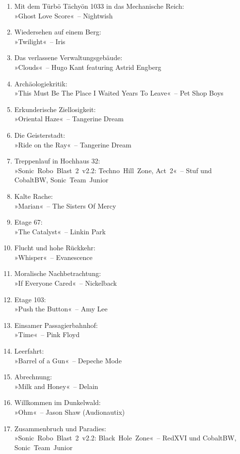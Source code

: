 \begin{enumerate}
    \item Mit dem Türbö Tächyön 1033 in das Mechanische Reich:\\ »Ghost Love Score«~– Nightwish
    \item Wiedersehen auf einem Berg:\\ »Twilight«~– Iris
    \item Das verlassene Verwaltungsgebäude:\\ »Clouds«~– Hugo Kant featuring Astrid Engberg
    \item Archäologiekritik:\\ »This Must Be The Place I Waited Years To Leave«~– Pet Shop Boys
    \item Erkunderische Ziellosigkeit:\\ »Oriental Haze«~– Tangerine Dream
    \item Die Geisterstadt:\\ »Ride on the Ray«~– Tangerine Dream
    \item Treppenlauf in Hochhaus 32:\\ »Sonic~Robo~Blast~2~v2.2: Techno~Hill~Zone, Act~2«~– Stuf und CobaltBW, Sonic~Team~Junior
    \item Kalte Rache:\\ »Marian«~– The Sisters Of Mercy
    \item Etage 67:\\ »The Catalyst«~– Linkin Park
    \item Flucht und hohe Rückkehr:\\ »Whisper«~– Evanescence
    \item Moralische Nachbetrachtung:\\ »If Everyone Cared«~– Nickelback
    \item Etage 103:\\ »Push the Button«~– Amy Lee
    \item Einsamer Passagierbahnhof:\\ »Time«~– Pink Floyd
    \item Leerfahrt:\\ »Barrel of a Gun«~– Depeche Mode
    \item Abrechnung:\\ »Milk and Honey«~– Delain
    \item Willkommen im Dunkelwald:\\ »Ohm«~– Jason Shaw (Audionautix)
    \item Zusammenbruch und Paradies:\\ »Sonic~Robo~Blast~2~v2.2: Black~Hole~Zone«~– RedXVI und CobaltBW, Sonic~Team~Junior

\end{enumerate}
